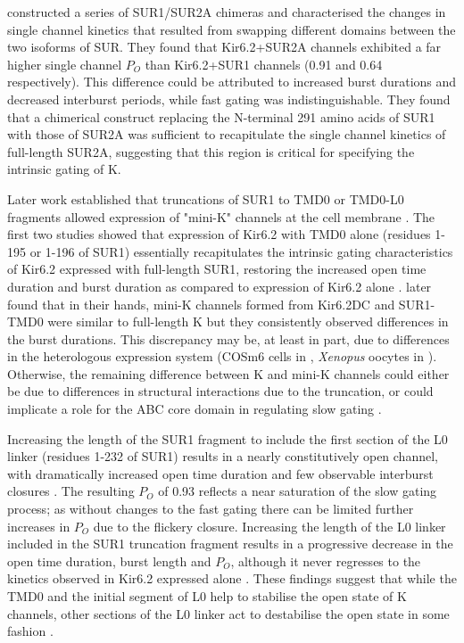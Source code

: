 \textcite{babenko_two_1999} constructed a series of SUR1/SUR2A chimeras and characterised the changes in single channel kinetics that resulted from swapping different domains between the two isoforms of SUR.
They found that Kir6.2+SUR2A channels exhibited a far higher single channel $P_O$ than Kir6.2+SUR1 channels (0.91 and 0.64 respectively).
This difference could be attributed to increased burst durations and decreased interburst periods, while fast gating was indistinguishable.
They found that a chimerical construct replacing the N-terminal 291 amino acids of SUR1 with those of SUR2A was sufficient to recapitulate the single channel kinetics of full-length SUR2A, suggesting that this region is critical for specifying the intrinsic gating of K\ATP{}.

Later work established that truncations of SUR1 to TMD0 or TMD0-L0 fragments allowed expression of "mini-K\ATP{}" channels at the cell membrane \cite{babenko_sur_2003, chan_n-terminal_2003, fang_n-terminal_2006}.
The first two studies showed that expression of Kir6.2 with TMD0 alone (residues 1-195 or 1-196 of SUR1) essentially recapitulates the intrinsic gating characteristics of Kir6.2 expressed with full-length SUR1, restoring the increased open time duration and burst duration as compared to expression of Kir6.2 alone \cite{babenko_sur_2003, chan_n-terminal_2003}.
\textcite{fang_n-terminal_2006} later found that in their hands, mini-K\ATP{} channels formed from Kir6.2\textgreek{D}C and SUR1-TMD0 were similar to full-length K\ATP{} but they consistently observed differences in the burst durations.
This discrepancy may be, at least in part, due to differences in the heterologous expression system (COSm6 cells in \textcite{babenko_sur_2003}, \textit{Xenopus} oocytes in \textcite{fang_n-terminal_2006}).
Otherwise, the remaining difference between K\ATP{} and mini-K\ATP{} channels could either be due to differences in structural interactions due to the truncation, or could implicate a role for the ABC core domain in regulating slow gating \cite{fang_n-terminal_2006}.

Increasing the length of the SUR1 fragment to include the first section of the L0 linker (residues 1-232 of SUR1) results in a nearly constitutively open channel, with dramatically increased open time duration and few observable interburst closures \cite{babenko_sur_2003}.
The resulting $P_O$ of 0.93 reflects a near saturation of the slow gating process; as without changes to the fast gating there can be limited further increases in $P_O$ due to the flickery closure.
Increasing the length of the L0 linker included in the SUR1 truncation fragment results in a progressive decrease in the open time duration, burst length and $P_O$, although it never regresses to the kinetics observed in Kir6.2 expressed alone \cite{babenko_sur_2003}.
These findings suggest that while the TMD0 and the initial segment of L0 help to stabilise the open state of K\ATP{} channels, other sections of the L0 linker act to destabilise the open state in some fashion \cite{babenko_sur_2003, puljung_cryo-electron_2018-1}.

